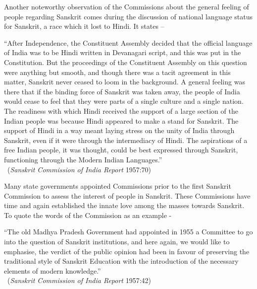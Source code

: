 Another noteworthy observation of the Commissions about the general feeling of people regarding Sanskrit comes during the discussion of national language status for Sanskrit, a race which it lost to Hindi. It states – 
\begin{myquote}
\eleven
“After Independence, the Constituent Assembly decided that the official language of India was to be Hindi written in Devanagari script, and this was put in the Constitution. But the proceedings of the Constituent Assembly on this question were anything but smooth, and though there was a tacit agreement in this matter, Sanskrit never ceased to loom in the background. A general feeling was there that if the binding force of Sanskrit was taken away, the people of India would cease to feel that they were parts of a single culture and a single nation. The readiness with which Hindi received the support of a large section of the Indian people was because Hindi appeared to make a stand for Sanskrit. The support of Hindi in a way meant laying stress on the unity of India through Sanskrit, even if it were through the intermediacy of Hindi. The aspirations of a free Indian people, it was thought, could be best expressed through Sanskrit, functioning through the Modern Indian Languages.”\\[-15pt] 

~\hfill ({\sl Sanskrit Commission of India Report} 1957:70)
\end{myquote}

Many state governments appointed Commissions prior to the first Sanskrit Commission to assess the interest of people in Sanskrit. These Commissions have time and again established the innate love among the masses towards Sanskrit. To quote the words of the Commission as an example - 
\begin{myquote}
\eleven
“The old Madhya Pradesh Government had appointed in 1955 a Committee to go into the question of Sanskrit institutions, and here again, we would like to emphasise, the verdict of the public opinion had been in favour of preserving the traditional style of Sanskrit Education with the introduction of the necessary elements of modern knowledge.”\\[-15pt]

~\hfill ({\sl Sanskrit Commission of India Report} 1957:42)
\end{myquote}

